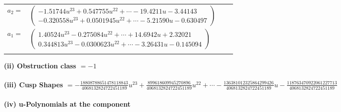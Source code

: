 \documentclass[1p]{elsarticle_modified}
\theoremstyle{definition}
\begin{document}
\begin{tabular}{m{7pt} m{180pt} m{7pt} m{180pt} }
\flushright $a_{2}=$&$\begin{pmatrix}-1.51744 u^{23}+0.547755 u^{22}+\cdots-19.4211 u-3.44143\\-0.320558 u^{23}+0.0501945 u^{22}+\cdots-5.21590 u-0.630497\end{pmatrix}$ \\
\flushright $a_{1}=$&$\begin{pmatrix}1.40524 u^{23}-0.275084 u^{22}+\cdots+14.6942 u+2.32021\\0.344813 u^{23}-0.0300623 u^{22}+\cdots-3.26431 u-0.145094\end{pmatrix}$\\&\end{tabular}
\flushleft \textbf{(ii) Obstruction class $= -1$}\\~\\
\flushleft \textbf{(iii) Cusp Shapes $= -\frac{18808788651478118843}{4068132824722451189} u^{23}+\frac{899618609945270896}{4068132824722451189} u^{22}+\cdots-\frac{136381012325864299426}{4068132824722451189} u-\frac{118763470922061227713}{4068132824722451189}$}\\~\\
\newpage\renewcommand{\arraystretch}{1}
\flushleft \textbf{(iv) u-Polynomials at the component}\newline \\
\end{document}
